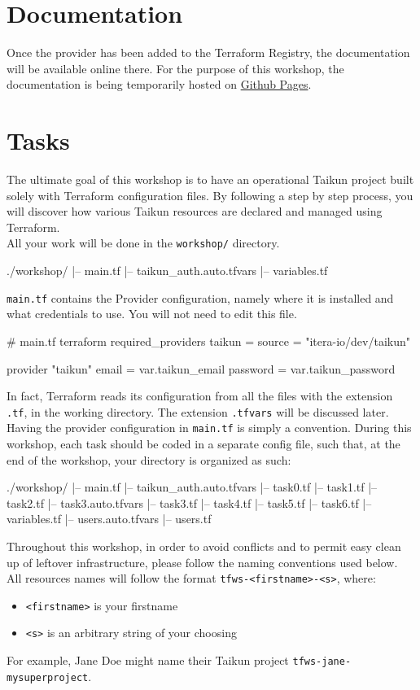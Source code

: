 \section{Documentation}
Once the provider has been added to the Terraform Registry, the documentation will be available online there.
For the purpose of this workshop, the documentation is being temporarily hosted on \href{https://intuinewin.github.io/taikun-docs/}{Github Pages}.

\section{Tasks}
The ultimate goal of this workshop is to have an operational Taikun project built solely with Terraform
configuration files.
By following a step by step process, you will discover how various Taikun
resources are declared and managed using Terraform.\\

All your work will be done in the \texttt{workshop/} directory.
\begin{raw}
./workshop/
|-- main.tf
|-- taikun_auth.auto.tfvars
|-- variables.tf
\end{raw}
\texttt{main.tf} contains the Provider configuration, namely where it is installed
and what credentials to use. You will not need to edit this file.
\begin{tf}
# main.tf
terraform {
  required_providers {
    taikun = {
      source = "itera-io/dev/taikun"
    }
  }
}

provider "taikun" {
  email    = var.taikun_email
  password = var.taikun_password
}
\end{tf}
In fact, Terraform reads its configuration from all the files with the extension \texttt{.tf},
in the working directory. The extension \texttt{.tfvars} will be discussed later.
Having the provider configuration in \texttt{main.tf} is simply a convention.
During this workshop, each task should be coded in a separate config file,
such that, at the end of the workshop, your directory is organized as such:
\begin{raw}
./workshop/
|-- main.tf
|-- taikun_auth.auto.tfvars
|-- task0.tf
|-- task1.tf
|-- task2.tf
|-- task3.auto.tfvars
|-- task3.tf
|-- task4.tf
|-- task5.tf
|-- task6.tf
|-- variables.tf
|-- users.auto.tfvars
|-- users.tf
\end{raw}

\begin{warn}
  Throughout this workshop, in order to avoid conflicts and
  to permit easy clean up of leftover infrastructure, please follow the naming conventions used below.\\

  All resources names will follow the format \texttt{tfws-<firstname>-<s>}, where:
  \begin{itemize}
    \item \texttt{<firstname>} is your firstname
    \item \texttt{<s>} is an arbitrary string of your choosing
  \end{itemize}
  For example, Jane Doe might name their Taikun project \texttt{tfws-jane-mysuperproject}.
\end{warn}

